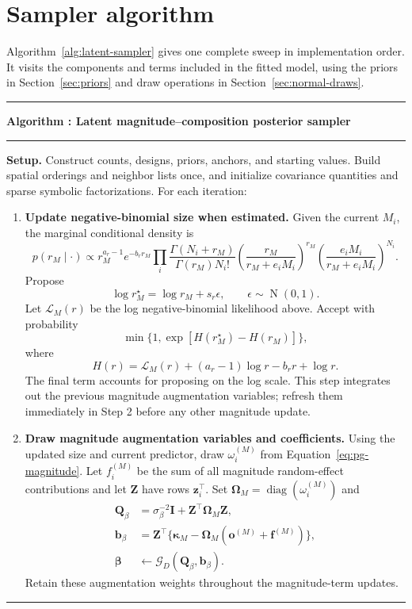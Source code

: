\documentclass[11pt]{article}
\newcommand{\bb}{\bm{b}}
\newcommand{\bbeta}{\bm{\beta}}
\newcommand{\bz}{\bm{z}}
\newcommand{\bI}{\bm{I}}
\newcommand{\bQ}{\bm{Q}}
\newcommand{\bZ}{\bm{Z}}
\newcommand{\bo}{\bm{o}}
\newcommand{\bOmega}{\bm{\Omega}}
\newcommand{\bkappa}{\bm{\kappa}}
\newcounter{sampleralgorithm}
\newenvironment{sampleralgorithm}[2]{%
  \par\medskip\noindent\begin{minipage}{\linewidth}
  \refstepcounter{sampleralgorithm}\hrule\smallskip
  \noindent\textbf{Algorithm \thesampleralgorithm: #1}\par\smallskip\hrule\medskip
  #2\par
  \end{minipage}\par\medskip
}{\par\smallskip\hrule\medskip}
\newcommand{\trans}{^\top}
\newcommand{\Normal}{\operatorname{N}}
\begin{document}
\section{Sampler algorithm}
\label{sec:sampler-algorithm}

Algorithm~\ref{alg:latent-sampler} gives one complete sweep in implementation
order. It visits the components and terms included in the fitted model, using
the priors in Section~\ref{sec:priors} and draw operations in
Section~\ref{sec:normal-draws}.

\begin{sampleralgorithm}{Latent magnitude--composition posterior sampler}{%
\label{alg:latent-sampler}
\textbf{Setup.} Construct counts, designs, priors, anchors, and starting values.
Build spatial orderings and neighbor lists once, and initialize covariance
quantities and sparse symbolic factorizations. For each iteration:}
\begin{enumerate}[label=\textbf{\arabic*.},leftmargin=2em,itemsep=0.8em]
\item \textbf{Update negative-binomial size when estimated.}
Given the current \(M_i\), the marginal conditional density is
\begin{equation}
 p(r_M\mid\cdot)\propto r_M^{a_r-1}e^{-b_r r_M}
 \prod_i\frac{\Gamma(N_i+r_M)}{\Gamma(r_M)N_i!}
 \left(\frac{r_M}{r_M+e_iM_i}\right)^{r_M}
 \left(\frac{e_iM_i}{r_M+e_iM_i}\right)^{N_i}.
 \label{eq:size-conditional}
\end{equation}
Propose
\begin{equation}
 \log r_M^\star=\log r_M+s_r\epsilon,\qquad
 \epsilon\sim\Normal(0,1).
 \label{eq:nb-size-proposal}
\end{equation}
Let \(\mathcal L_M(r)\) be the log negative-binomial likelihood above.
Accept with probability
\[
  \min\{1,\exp[H(r_M^\star)-H(r_M)]\},
\]
where
\begin{equation}
 H(r)=\mathcal L_M(r)+(a_r-1)\log r-b_r r+\log r.
 \label{eq:nb-size-log-target}
\end{equation}
The final term accounts for proposing on the log scale. This step integrates
out the previous magnitude augmentation variables; refresh them immediately
in Step 2 before any other magnitude update.

\item \textbf{Draw magnitude augmentation variables and coefficients.}
Using the updated size and current predictor, draw \(\omega_i^{(M)}\) from
Equation~\ref{eq:pg-magnitude}. Let \(f_i^{(M)}\) be the sum of all magnitude
random-effect contributions and let \(\bZ\) have rows \(\bz_i\trans\).
Set \(\bOmega_M=\operatorname{diag}(\omega_i^{(M)})\) and
\begin{equation}
 \begin{aligned}
  \bQ_\beta&=\sigma_\beta^{-2}\bI+\bZ\trans\bOmega_M\bZ,\\
  \bb_\beta&=\bZ\trans\{\bkappa_M-
        \bOmega_M(\bo^{(M)}+\boldsymbol f^{(M)})\},\\
  \bbeta&\leftarrow\mathcal G_D(\bQ_\beta,\bb_\beta).
 \end{aligned}
 \label{eq:beta-update}
\end{equation}
Retain these augmentation weights throughout the magnitude-term updates.


\end{enumerate}
\end{sampleralgorithm}
\end{document}
